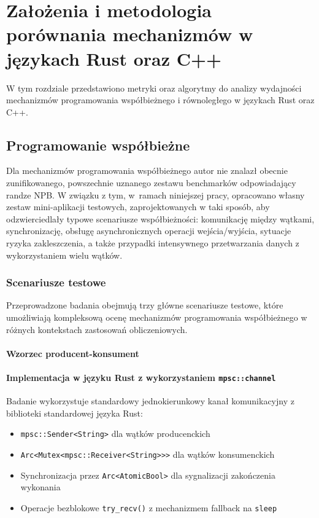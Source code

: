 \chapter{Założenia i metodologia porównania mechanizmów w językach Rust oraz C++}
W tym rozdziale przedstawiono metryki oraz algorytmy do analizy wydajności mechanizmów programowania współbieżnego i równoległego w językach Rust oraz C++. 
\section{Programowanie współbieżne}
Dla mechanizmów programowania współbieżnego autor nie znalazł obecnie zunifikowanego, powszechnie uznanego zestawu benchmarków odpowiadający randze NPB. W związku z tym, w~ramach niniejszej pracy, opracowano własny zestaw mini-aplikacji testowych, zaprojektowanych w taki sposób, aby odzwierciedlały typowe scenariusze współbieżności: komunikację między wątkami, synchronizację, obsługę asynchronicznych operacji wejścia/wyjścia, sytuacje ryzyka zakleszczenia, a także przypadki intensywnego przetwarzania danych z wykorzystaniem wielu wątków.

\subsection{Scenariusze testowe}

Przeprowadzone badania obejmują trzy główne scenariusze testowe, które umożliwiają kompleksową ocenę mechanizmów programowania współbieżnego w różnych kontekstach zastosowań obliczeniowych.

\subsubsection{Wzorzec producent-konsument}

\subsubsection{Implementacja w języku Rust z wykorzystaniem \texttt{mpsc::channel}}
Badanie wykorzystuje standardowy jednokierunkowy kanał komunikacyjny z biblioteki standardowej języka Rust:
\begin{itemize}
    \item \texttt{mpsc::Sender<String>} dla wątków producenckich
    \item \texttt{Arc<Mutex<mpsc::Receiver<String>>>} dla wątków konsumenckich
    \item Synchronizacja przez \texttt{Arc<AtomicBool>} dla sygnalizacji zakończenia wykonania
    \item Operacje bezblokowe \texttt{try\_recv()} z mechanizmem fallback na \texttt{sleep}
\end{itemize}

